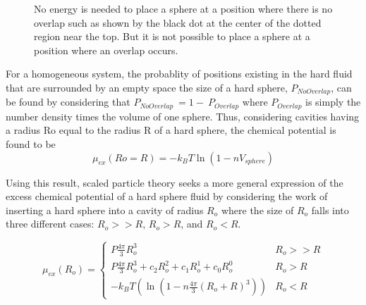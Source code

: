 \documentclass[12pt]{article}
\begin{document}
\begin{figure}[h!]
    \centering
    \caption{No energy is needed to place a sphere at a position where there is no overlap such as shown by the black dot at the center of the dotted region near the top. But it is not possible to place a sphere at a position where an overlap occurs.}
    \label{fig:p_overlap}
  \end{figure}

For a homogeneous system, the probablity of positions existing in the hard fluid that are surrounded by an empty space the size of a hard sphere, $P_{NoOverlap}$, can be found by considering that $P_{NoOverlap}~=1-~P_{Overlap}$ where $P_{Overlap}$ is simply the number density times the volume of one sphere. 
\color{red}Thus, considering cavities having a radius Ro equal to the radius R of a hard sphere, the chemical potential is found to be \color{black}
\begin{equation}\mu_{ex}(Ro=R)=-k_BT\ln\left(1-nV_{sphere}\right)\end{equation}


Using this result, scaled particle theory seeks a more general expression of the excess chemical potential of a hard sphere fluid by considering the work of inserting a hard sphere into a cavity of radius $R_o$ where the size of $R_o$ falls into three different cases: $R_o >> R$, $R_o > R$, and $R_o < R$. 

\begin{equation}\label{3_parts_to_mu_ex}{\mu_{ex}(R_o)=\left\{ \begin{array}{rc} P\frac{4\pi}{3}R_o^3 & R_o >> R \\ P\frac{4\pi}{3}R_o^3 + c_2R_o^2 + c_1R_o^1 + c_0R_o^0  & R_o > R \\ -k_BT(\ln(1-n\frac{4\pi}{3}(R_o+R)^3)) & R_o < R\end{array}\right.}\end{equation}

\end{document}
